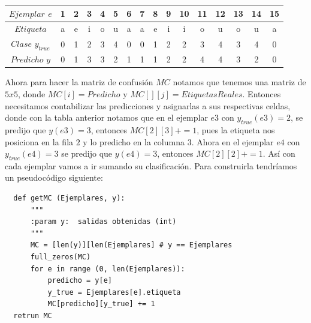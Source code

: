 \begin{description}
\begin{example}
\begin{center}
\begin{tabular}{c|ccccccccccccccc}

 $Ejemplar$ $e$     & 1 & 2 & 3 & 4 & 5 & 6 & 7 & 8 & 9 & 10 & 11 & 12 & 13 & 14 & 15 \\ \hline
 $Etiqueta $      & a & e & i & o & u & a & a & e & i & i  & o  & u  & o  & u & a \\ \hline
 $Clase$ $y_{true}$ & 0 & 1 & 2 & 3 & 4 & 0 & 0 & 1 & 2 & 2  & 3  & 4  & 3  & 4 & 0 \\ \hline
 $Predicho$ $y$     & 0 & 1 & 3 & 3 & 2 & 1 & 1 & 1 & 2 & 2  & 4  & 4  & 3  & 2 & 0 \\ \hline

\end{tabular}
\end{center}

 Ahora para hacer la matriz de confusión $MC$ notamos que tenemos una matriz de $5 x 5$, donde $MC[i]= Predicho$ y $MC[][j] = EtiquetasReales$. Entonces necesitamos contabilizar las predicciones y asignarlas a sus respectivas celdas, donde con la tabla anterior notamos que en el ejemplar $e3$ con $y_{true}(e3)= 2$, se predijo que $y(e3)=3$, entonces $MC[2][3] +=1$, pues la etiqueta nos posiciona en la fila $2$ y lo predicho en la columna $3$. Ahora en el ejemplar $e4$ con $y_{true}(e4)= 3$ se predijo que $y(e4)= 3$, entonces  $MC[2][2] +=1$. Así con cada ejemplar vamos a ir sumando su clasificación. Para construirla tendríamos un pseudocódigo siguiente:
 \begin{verbatim}
  def getMC (Ejemplares, y):
      """
      :param y:  salidas obtenidas (int)
      """
      MC = [len(y)][len(Ejemplares] # y == Ejemplares
      full_zeros(MC)
      for e in range (0, len(Ejemplares)):
          predicho = y[e]
          y_true = Ejemplares[e].etiqueta
          MC[predicho][y_true] += 1
  retrun MC
 \end{verbatim}


\end{example}
\end{description}
